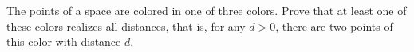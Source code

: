 The points of a space are colored in one of three colors. Prove that at least one of these colors realizes all distances, that is, for any $d > 0$, there are two points of this color with distance $d$.

